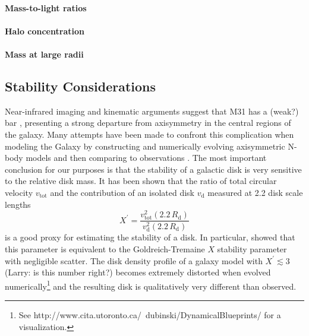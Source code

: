 \documentclass[preprint]{aastex}
\begin{document}
\paragraph{Mass-to-light ratios}

\paragraph{Halo concentration}

\paragraph{Mass at large radii}


\subsection{Stability Considerations}


Near-infrared imaging and kinematic arguments suggest that M31 has a (weak?) bar \citep{Beaton:2007,Saglia:2010}, presenting a strong departure from axisymmetry in the central regions of the galaxy.  Many attempts have been made to confront this complication when modeling the Galaxy by constructing and numerically evolving axisymmetric N-body models and then comparing to observations \citet{Ostriker:1973,Sellwood:1985,Fux:1997,Widrow:2008}.  The most important conclusion for our purposes is that the stability of a galactic disk is very sensitive to the relative disk mass.  It has been shown \citep{Debattista:2000,Widrow:2008} that the ratio of total circular velocity $v_\mathrm{tot}$ and the contribution of an isolated disk $v_\mathrm{d}$ measured at 2.2 disk scale lengths
\begin{equation}
    X^\prime = \frac{v_\mathrm{tot}^2 (2.2\,R_\mathrm{d})}{v_\mathrm{d}^2 (2.2\,R_\mathrm{d})}
\end{equation}
is a good proxy for estimating the stability of a disk.  In particular, \citet{Widrow:2008} showed that this parameter is equivalent to the Goldreich-Tremaine $X$ stability parameter \citep{Goldreich:1978,Goldreich:1979} with negligible scatter.  The disk density profile of a galaxy model with $X^\prime \lesssim 3$ (Larry:  is this number right?) becomes extremely distorted when evolved numerically\footnote{See http://www.cita.utoronto.ca/~dubinski/DynamicalBlueprints/ for a visualization.} and the resulting disk is qualitatively very different than observed.
\end{document}
